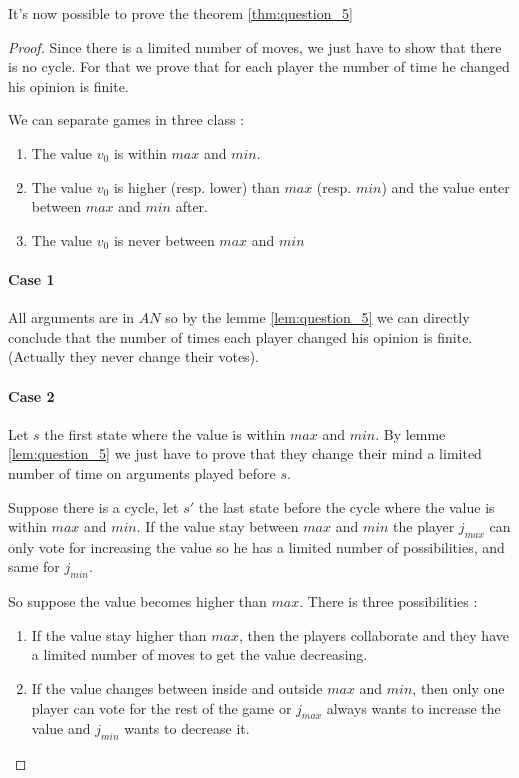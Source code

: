 \documentclass[12pt]{article}
\theoremstyle{defi}
\theoremstyle{not}
\theoremstyle{prob}
\begin{document}
      It's now possible to prove the theorem \ref{thm:question_5}
      \begin{proof}
        Since there is a limited number of moves, we just have to show that there is no cycle. For that we prove that for each player the number of time he changed his opinion is finite.

        We can separate games in three class :
        \begin{enumerate}
          \item The value $v_0$ is within $max$ and $min$.
          \item The value $v_0$ is higher (resp. lower) than $max$ (resp. $min$) and the value enter between $max$ and $min$ after.
          \item The value $v_0$ is never between $max$ and $min$
        \end{enumerate}

        \paragraph{Case 1}
        All arguments are in $AN$ so by the lemme \ref{lem:question_5} we can directly conclude that the number of times each player changed his opinion is finite. (Actually they never change their votes).

        \paragraph{Case 2}
        Let $s$ the first state where the value is within $max$ and $min$. By lemme \ref{lem:question_5} we just have to prove that they change their mind a limited number of time on arguments played before $s$.

        Suppose there is a cycle, let $s'$ the last state before the cycle where the value is within $max$ and $min$.
        If the value stay between $max$ and $min$ the player $j_{max}$ can only vote for increasing the value so he has a limited number of possibilities, and same for $j_{min}$.

        So suppose the value becomes higher than $max$. There is three possibilities :

        \begin{enumerate}
          \item If the value stay higher than $max$, then the players collaborate and they have a limited number of moves to get the value decreasing.

          \item If the value changes between inside and outside $max$ and $min$, then only one player can vote for the rest of the game or $j_{max}$ always wants to increase the value and $j_{min}$ wants to decrease it.


\end{enumerate}
\end{proof}
\end{document}
